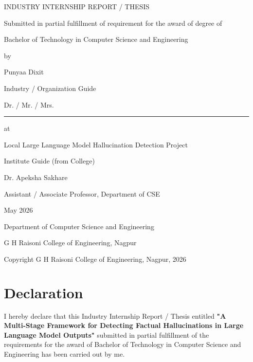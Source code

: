 \documentclass[12pt,a4paper]{report}
\begin{document}
\begin{titlepage}
\centering
{\Large INDUSTRY INTERNSHIP REPORT / THESIS\par}
\vspace{0.8cm}
{\normalsize Submitted in partial fulfillment of requirement for the award of degree of\par}
\vspace{0.5cm}
{\Large Bachelor of Technology in Computer Science and Engineering\par}
\vspace{0.8cm}
{\large by\par}
\vspace{0.3cm}
{\Large Punyaa Dixit\par}
\vspace{0.8cm}
{\large Industry / Organization Guide\par}
{\large Dr. / Mr. / Mrs. \rule{7cm}{0.4pt}\par}
\vspace{0.6cm}
{\large at\par}
{\Large Local Large Language Model Hallucination Detection Project\par}
\vspace{0.6cm}
{\large Institute Guide (from College)\par}
{\large Dr. Apeksha Sakhare\par}
{\large Assistant / Associate Professor, Department of CSE\par}
\vspace{0.8cm}
{\large May 2026\par}
\vfill
{\large Department of Computer Science and Engineering\par}
{\large G H Raisoni College of Engineering, Nagpur\par}
\vspace{0.3cm}
{\small Copyright \textcopyright{} G H Raisoni College of Engineering, Nagpur, 2026\par}
\end{titlepage}

\chapter*{Declaration}
I hereby declare that this Industry Internship Report / Thesis entitled
\textbf{"A Multi-Stage Framework for Detecting Factual Hallucinations in Large Language Model Outputs"}
submitted in partial fulfillment of the requirements for the award of
Bachelor of Technology in Computer Science and Engineering has been carried out by me.
\end{document}
